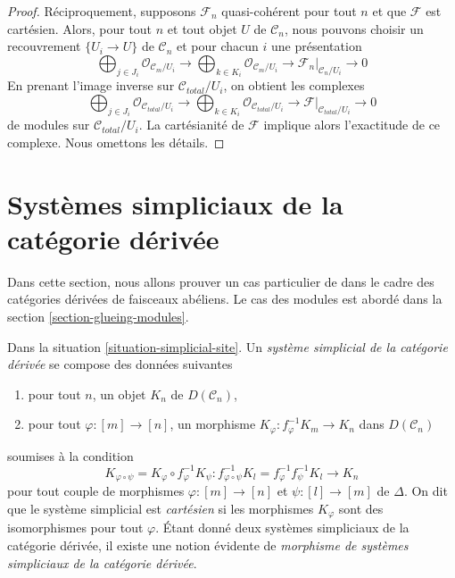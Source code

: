 \begin{proof}
\medskip\noindent
Réciproquement, supposons $\mathcal{F}_n$
quasi-cohérent pour tout $n$ et que $\mathcal{F}$ est cartésien.
Alors, pour tout $n$ et tout objet $U$ de $\mathcal{C}_n$, nous
pouvons choisir un recouvrement $\{U_i \to U\}$ de $\mathcal{C}_n$
et pour chacun $i$ une présentation
$$
\bigoplus\nolimits_{j \in J_i} \mathcal{O}_{\mathcal{C}_m/U_i} \to
\bigoplus\nolimits_{k \in K_i} \mathcal{O}_{\mathcal{C}_m/U_i} \to
\mathcal{F}_n|_{\mathcal{C}_n/U_i} \to 0
$$
En prenant l'image inverse sur $\mathcal{C}_{total}/U_i$, on obtient les complexes
$$
\bigoplus\nolimits_{j \in J_i} \mathcal{O}_{\mathcal{C}_{total}/U_i} \to
\bigoplus\nolimits_{k \in K_i} \mathcal{O}_{\mathcal{C}_{total}/U_i} \to
\mathcal{F}|_{\mathcal{C}_{total}/U_i} \to 0
$$
de modules sur $\mathcal{C}_{total}/U_i$. La cartésianité de
$\mathcal{F}$ implique alors l'exactitude de ce complexe.
Nous omettons les détails.
\end{proof}











\section{Systèmes simpliciaux de la catégorie dérivée}
\label{section-glueing}

\noindent
Dans cette section, nous allons prouver un cas particulier de
\cite[Proposition 3.2.9]{BBD} dans le cadre des catégories dérivées
de faisceaux abéliens. Le cas des modules
est abordé dans la section \ref{section-glueing-modules}.

\begin{definition}
\label{definition-cartesian-derived}
Dans la situation \ref{situation-simplicial-site}. Un
{\it système simplicial de la catégorie dérivée}
se compose des données suivantes
\begin{enumerate}
\item pour tout $n$, un objet $K_n$ de $D(\mathcal{C}_n)$,
\item pour tout $\varphi : [m] \to [n]$, un morphisme
$K_\varphi : f_\varphi^{-1}K_m \to K_n$ dans $D(\mathcal{C}_n)$
\end{enumerate}
soumises à la condition
$$
K_{\varphi \circ \psi} = K_\varphi \circ f_\varphi^{-1}K_\psi :
f_{\varphi \circ \psi}^{-1}K_l = f_\varphi^{-1} f_\psi^{-1}K_l
\longrightarrow
K_n
$$
pour tout couple de morphismes $\varphi : [m] \to [n]$ et $\psi : [l] \to [m]$ de $\Delta$.
On dit que le système simplicial est {\it cartésien} si les morphismes $K_\varphi$
sont des isomorphismes pour tout $\varphi$.
Étant donné deux systèmes simpliciaux de la catégorie dérivée,
il existe une notion évidente de
{\it morphisme de systèmes simpliciaux de la catégorie dérivée}.
\end{definition}


